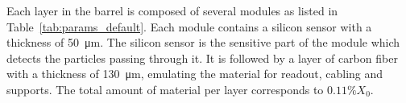

Each layer in the barrel is composed of several modules as listed in Table~\ref{tab:params_default}. Each module contains a silicon sensor with a thickness of \SI{50}{\micro\meter}. The silicon sensor is the sensitive part of the module which detects the particles passing through it. It is followed by a layer of carbon fiber with a thickness of \SI{130}{\micro\meter}, emulating the material for readout, cabling and supports. The total amount of material per layer corresponds to $0.11\%X_{0}$.\\
 
